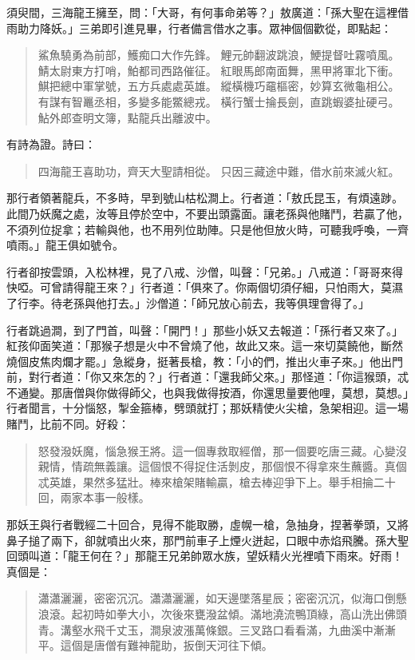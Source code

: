 須臾間，三海龍王擁至，問：「大哥，有何事命弟等？」敖廣道：「孫大聖在這裡借雨助力降妖。」三弟即引進見畢，行者備言借水之事。眾神個個歡從，即點起：
\begin{quote}
鯊魚驍勇為前部，鱯痴口大作先鋒。
鯉元帥翻波跳浪，鯁提督吐霧噴風。
鯖太尉東方打哨，鮊都司西路催征。
紅眼馬郎南面舞，黑甲將軍北下衝。
鯕把總中軍掌號，五方兵處處英雄。
縱橫機巧黿樞密，妙算玄微龜相公。
有謀有智鼉丞相，多變多能鱉總戎。
橫行蟹士掄長劍，直跳蝦婆扯硬弓。
鮎外郎查明文簿，點龍兵出離波中。
\end{quote}

有詩為證。詩曰：
\begin{quote}
四海龍王喜助功，齊天大聖請相從。
只因三藏途中難，借水前來滅火紅。
\end{quote}

那行者領著龍兵，不多時，早到號山枯松澗上。行者道：「敖氏昆玉，有煩遠踄。此間乃妖魔之處，汝等且停於空中，不要出頭露面。讓老孫與他賭鬥，若贏了他，不須列位捉拿；若輸與他，也不用列位助陣。只是他但放火時，可聽我呼喚，一齊噴雨。」龍王俱如號令。

行者卻按雲頭，入松林裡，見了八戒、沙僧，叫聲：「兄弟。」八戒道：「哥哥來得快啞。可曾請得龍王來？」行者道：「俱來了。你兩個切須仔細，只怕雨大，莫濕了行李。待老孫與他打去。」沙僧道：「師兄放心前去，我等俱理會得了。」

行者跳過澗，到了門首，叫聲：「開門！」那些小妖又去報道：「孫行者又來了。」紅孩仰面笑道：「那猴子想是火中不曾燒了他，故此又來。這一來切莫饒他，斷然燒個皮焦肉爛才罷。」急縱身，挺著長槍，教：「小的們，推出火車子來。」他出門前，對行者道：「你又來怎的？」行者道：「還我師父來。」那怪道：「你這猴頭，忒不通變。那唐僧與你做得師父，也與我做得按酒，你還思量要他哩，莫想，莫想。」行者聞言，十分惱怒，掣金箍棒，劈頭就打；那妖精使火尖槍，急架相迎。這一場賭鬥，比前不同。好殺：
\begin{quote}
怒發潑妖魔，惱急猴王將。這一個專救取經僧，那一個要吃唐三藏。心變沒親情，情疏無義讓。這個恨不得捉住活剝皮，那個恨不得拿來生蘸醬。真個忒英雄，果然多猛壯。棒來槍架賭輸贏，槍去棒迎爭下上。舉手相掄二十回，兩家本事一般樣。
\end{quote}

那妖王與行者戰經二十回合，見得不能取勝，虛幌一槍，急抽身，捏著拳頭，又將鼻子搥了兩下，卻就噴出火來，那門前車子上煙火迸起，口眼中赤焰飛騰。孫大聖回頭叫道：「龍王何在？」那龍王兄弟帥眾水族，望妖精火光裡噴下雨來。好雨！真個是：
\begin{quote}
瀟瀟灑灑，密密沉沉。瀟瀟灑灑，如天邊墜落星辰；密密沉沉，似海口倒懸浪滾。起初時如拳大小，次後來甕潑盆傾。滿地澆流鴨頂綠，高山洗出佛頭青。溝壑水飛千丈玉，澗泉波漲萬條銀。三叉路口看看滿，九曲溪中漸漸平。這個是唐僧有難神龍助，扳倒天河往下傾。
\end{quote}

